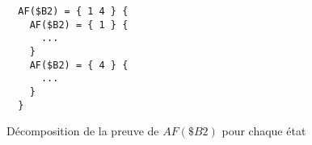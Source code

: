 \begin{figure}[H]
\centering
\begin{minipage}{0.25\linewidth}
\begin{verbatim}
  AF($B2) = { 1 4 } {
    AF($B2) = { 1 } {
      ...
    }
    AF($B2) = { 4 } {
      ...
    }
  }
\end{verbatim}
\end{minipage}
\caption{Décomposition de la preuve de $AF(\$B2)$ pour chaque état}
\label{fig:PreuveCheminAF}
\end{figure}